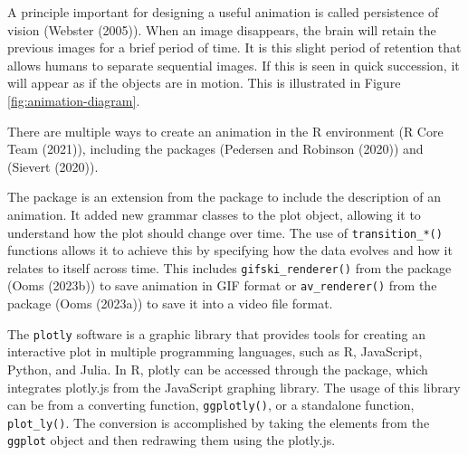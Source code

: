 A principle important for designing a useful animation is called persistence of vision (Webster (2005)). When an image disappears, the brain will retain the previous images for a brief period of time. It is this slight period of retention that allows humans to separate sequential images. If this is seen in quick succession, it will appear as if the objects are in motion. This is illustrated in Figure \ref{fig:animation-diagram}.

There are multiple ways to create an animation in the R environment (R Core Team (2021)), including the packages  (Pedersen and Robinson (2020)) and  (Sievert (2020)).

The  package is an extension from the  package to include the description of an animation. It added new grammar classes to the plot object, allowing it to understand how the plot should change over time. The use of \texttt{transition\_*()} functions allows it to achieve this by specifying how the data evolves and how it relates to itself across time. This includes \texttt{gifski\_renderer()} from the  package (Ooms (2023b)) to save animation in GIF format or \texttt{av\_renderer()} from the  package (Ooms (2023a)) to save it into a video file format.

The \texttt{plotly} software is a graphic library that provides tools for creating an interactive plot in multiple programming languages, such as R, JavaScript, Python, and Julia. In R, plotly can be accessed through the  package, which integrates plotly.js from the JavaScript graphing library. The usage of this library can be from a converting function, \texttt{ggplotly()}, or a standalone function, \texttt{plot\_ly()}. The conversion is accomplished by taking the elements from the \texttt{ggplot} object and then redrawing them using the plotly.js.

